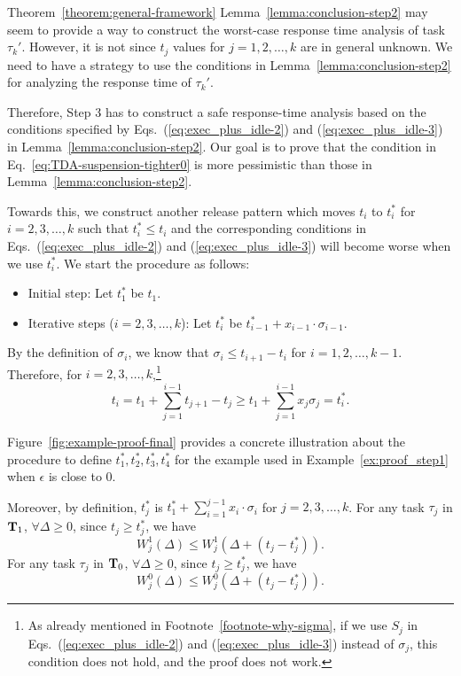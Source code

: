 \begin{appProof}{Theorem~\ref{theorem:general-framework}}
Lemma~\ref{lemma:conclusion-step2} may seem to provide a way to
construct the worst-case response time analysis of task
$\tau_k'$. However, it is not since $t_j$ values for $j=1,2,\ldots,k$
are in general unknown. We need to have a strategy to use the
conditions in Lemma~\ref{lemma:conclusion-step2} for analyzing the
response time of $\tau_k'$.

Therefore, Step 3 has to construct a safe response-time analysis based on the
conditions specified by Eqs.~(\ref{eq:exec_plus_idle-2}) and
(\ref{eq:exec_plus_idle-3}) in Lemma~\ref{lemma:conclusion-step2}. Our
goal is to prove that the condition in
Eq.~\eqref{eq:TDA-suspension-tighter0} is more pessimistic than those
in Lemma~\ref{lemma:conclusion-step2}.

Towards this, we construct another release pattern
which moves $t_i$ to $t_i^*$ for $i=2,3,\ldots,k$ such that $t_i^*
\leq t_i$ and the corresponding conditions in Eqs.~(\ref{eq:exec_plus_idle-2}) and
(\ref{eq:exec_plus_idle-3}) will become worse when we use $t_i^*$. We start
the procedure as follows:
\begin{itemize}
\item Initial step: Let $t_1^*$ be $t_1$.
\item Iterative steps ($i=2,3,\ldots,k$): Let $t_i^*$ be $t_{i-1}^*+x_{i-1}\cdot\sigma_{i-1}$.
\end{itemize}
By the definition of $\sigma_i$, we know that $\sigma_i \leq t_{i+1}-t_i$ for $i=1,2,\ldots,k-1$.
Therefore,  for $i=2,3,\ldots,k$,\footnote{As already mentioned in Footnote~\ref{footnote-why-sigma}, if we use $S_j$ in Eqs.~(\ref{eq:exec_plus_idle-2}) and
(\ref{eq:exec_plus_idle-3}) instead of $\sigma_j$, this condition does not hold, and the proof does not work.}
\begin{equation*}
  t_i = t_1 + \sum_{j=1}^{i-1} t_{j+1} - t_j \geq t_1 + \sum_{j=1}^{i-1} x_j \sigma_j = t_i^*.
\end{equation*}

Figure~\ref{fig:example-proof-final} provides a concrete illustration about the procedure to define $t_1^*, t_2^*, t_3^*, t_4^*$ for the example used in Example~\ref{ex:proof_step1} when $\epsilon$ is close to $0$.

 Moreover, by
definition, $t_j^*$ is $t_1^* + \sum_{i=1}^{j-1} x_i\cdot\sigma_i$ for
$j=2,3,\ldots,k$.
For any task $\tau_j$ in ${\bf T}_1$,  $\forall \Delta \geq 0$, since $t_j \geq t_j^*$, we have
\begin{equation}
  \label{eq:execution-case1-shifted}
  W_j^1(\Delta)  \leq W_j^1(\Delta + (t_j-t_j^*)).
\end{equation}
For any task $\tau_j$ in ${\bf T}_0$,  $\forall \Delta \geq 0$, since $t_j \geq t_j^*$, we have
\begin{equation}
  \label{eq:execution-case2-shifted}
  W_j^0(\Delta)  \leq W_j^0(\Delta + (t_j-t_j^*)).
\end{equation}


\end{appProof}
